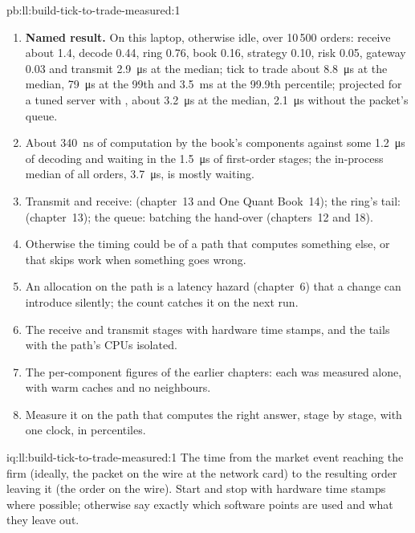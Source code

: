 \begin{solution}{pb:ll:build-tick-to-trade-measured:1}
\begin{enumerate}
tuning, measures it.
\item \textbf{Named result.} On this laptop, otherwise idle, over 10\,500 orders: receive about 1.4, decode 0.44, ring 0.76, book
0.16, strategy 0.10, risk 0.05, gateway 0.03 and transmit \qty{2.9}{\micro\second} at the median; tick to trade about
\qty{8.8}{\micro\second} at the median, \qty{79}{\micro\second} at the 99th and \qty{3.5}{\milli\second} at the 99.9th percentile;
projected for a tuned server with , about \qty{3.2}{\micro\second} at the median, \qty{2.1}{\micro\second} without
the packet's queue.
\item About \qty{340}{\nano\second} of computation by the book's components against some \qty{1.2}{\micro\second} of decoding and
waiting in the \qty{1.5}{\micro\second} of first-order stages; the in-process median of all orders, \qty{3.7}{\micro\second}, is
mostly waiting.
\item Transmit and receive:  (chapter~13 and One Quant Book~14); the ring's tail:  (chapter~13); the
queue: batching the hand-over (chapters~12 and 18).
\item Otherwise the timing could be of a path that computes something else, or that skips work when something goes wrong.
\item An allocation on the path is a latency hazard (chapter~6) that a change can introduce silently; the count catches it on
the next run.
\item The receive and transmit stages with hardware time stamps, and the tails with the path's CPUs isolated.
\item The per-component figures of the earlier chapters: each was measured alone, with warm caches and no neighbours.
\item Measure it on the path that computes the right answer, stage by stage, with one clock, in percentiles.
\end{enumerate}
\end{solution}

\begin{solution}{iq:ll:build-tick-to-trade-measured:1}
The time from the market event reaching the firm (ideally, the packet on the wire at the network card) to the resulting order
leaving it (the order on the wire). Start and stop with hardware time stamps where possible; otherwise say exactly which
software points are used and what they leave out.
\end{solution}


